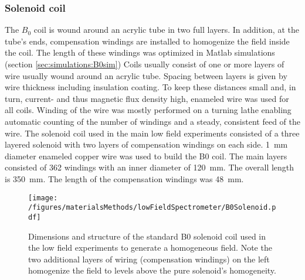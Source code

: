         \subsubsection{Solenoid coil}
            The $B_0$ coil is wound around an acrylic tube in two full layers. In addition, at the
            tube's ends, compensation windings are installed to homogenize the field inside the coil.
            The length of these windings was optimized in Matlab simulations (section \ref{sec:simulations:B0sim})
            Coils usually consist of one or more layers of wire usually wound around an acrylic tube. Spacing between layers is given by wire thickness including insulation coating. To keep  these distances small and, in turn, current- and thus magnetic flux density high, enameled wire was used for all coils. Winding of the wire was mostly performed on a turning lathe enabling automatic counting of the number of windings and a steady, consistent feed of the wire.
            The solenoid coil used in the main low field experiments consisted of a three layered solenoid with two layers of compensation windings on each side. \SI{1}{\mm} diameter enameled copper wire was used to build the B0 coil. The main layers consisted of 362 windings with an inner diameter of \SI{120}{\mm}. The overall length is \SI{350}{\milli\meter}. The length of the compensation windings was \SI{48}{\mm}.
            \begin{figure}
                \centering
                \texttt{[image: /figures/materialsMethods/lowFieldSpectrometer/B0Solenoid.pdf]}
                \caption[B0 coil layout]{Dimensions and structure of the standard B0 solenoid coil used in the low field experiments to generate a homogeneous field. Note the two additional layers of wiring (compensation windings) on the left homogenize the field to levels above the pure solenoid's homogeneity.}
                \label{fig:matMeth:b0Solenoid}
            \end{figure}
